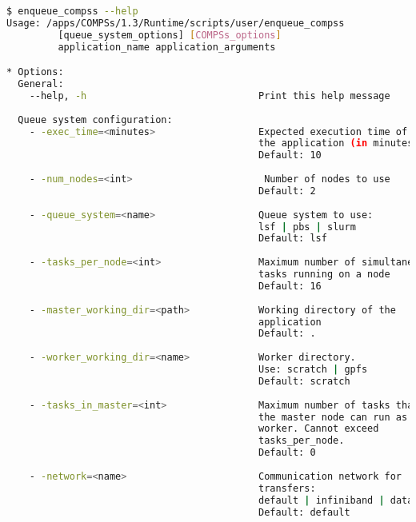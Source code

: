 \begin{lstlisting}[language=bash]
$ enqueue_compss --help
Usage: /apps/COMPSs/1.3/Runtime/scripts/user/enqueue_compss 
         [queue_system_options] [COMPSs_options] 
         application_name application_arguments

* Options:
  General:
    --help, -h                              Print this help message
  
  Queue system configuration:
    - -exec_time=<minutes>                  Expected execution time of 
                                            the application (in minutes)
                                            Default: 10
                                            
    - -num_nodes=<int>                       Number of nodes to use
                                            Default: 2
                                            
    - -queue_system=<name>                  Queue system to use: 
                                            lsf | pbs | slurm
                                            Default: lsf
                                            
    - -tasks_per_node=<int>                 Maximum number of simultaneous
                                            tasks running on a node
                                            Default: 16
                                            
    - -master_working_dir=<path>            Working directory of the 
                                            application
                                            Default: .
                                            
    - -worker_working_dir=<name>            Worker directory. 
                                            Use: scratch | gpfs
                                            Default: scratch
                                            
    - -tasks_in_master=<int>                Maximum number of tasks that
                                            the master node can run as 
                                            worker. Cannot exceed 
                                            tasks_per_node.
                                            Default: 0
                                            
    - -network=<name>                       Communication network for 
                                            transfers:
                                            default | infiniband | data.
                                            Default: default
                                            

\end{lstlisting}

